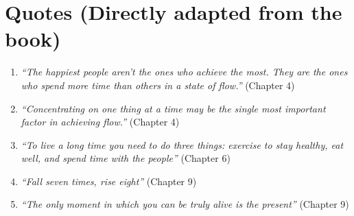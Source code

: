 \section*{Quotes (Directly adapted from the book)}
\begin{enumerate}
    \item \emph{``The happiest people aren’t the ones who achieve the most. They are the ones who spend more time than others in a state of flow.''} (Chapter 4)
    \item \emph{``Concentrating on one thing at a time may be the single most important factor in achieving flow.''} (Chapter 4)
    \item \emph{``To live a long time you need to do three things: exercise to stay healthy, eat well, and spend time with the people''} (Chapter 6)
    \item \emph{``Fall seven times, rise eight''} (Chapter 9)
    \item \emph{``The only moment in which you can be truly alive is the present''} (Chapter 9)
\end{enumerate}